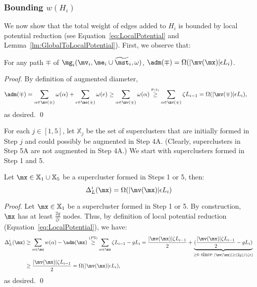 \subsubsection{Bounding $w(H_i)$}\label{subsec:HiWeightOracle}


We now show that the total weight of edges added to $H_i$ is bounded by local potential reduction (see Equation~\eqref{eq:LocalPotential} and Lemma~\ref{lm:GlobalToLocalPotential}).  First, we observe that:

\begin{claim}\label{clm:ADM-vs-Size}
	For any path $\mp$ of $\mg_i(\mv_i,\me_i\cup \widetilde{\mst}_i,\omega)$, $\adm(\mp) = \Omega(|\mv(\mx)| \epsilon L_i)$.
\end{claim}
\begin{proof}
	By definition of augmented diameter,
	\begin{equation*}
	\begin{split}
	\adm(\mp) &= \sum_{\alpha \in \mv(\mp)}\omega(\alpha) + \sum_{e\in \me(\mp)}\omega(e)  \geq \sum_{\alpha \in \mv(\mp)}\omega(\alpha) \stackrel{\mbox{\tiny{P(5)}}}{\geq}  \sum_{\alpha \in \mv(\mp)}\zeta L_{i-1}= \Omega(|\mv(\mp)| \epsilon L_i),
	\end{split}
	\end{equation*}
as desired.
\qed
\end{proof}
For each $j \in [1,5]$, let $\mathbb{X}_j$ be the set of superclusters that are initially formed in Step $j$ and could possibly be augmented in Step 4A. (Clearly, superclusters in Step 5A are not augmented in Step 4A.) We start with superclusters formed in Step 1 and 5.

\begin{lemma}\label{lm:Step15WeightOracle}
	Let $\mx \in \mathbb{X}_1 \cup \mathbb{X}_5$ be a supercluster formed in  Steps 1 or 5, then:
	\begin{equation*}
	\Delta^i_{L}(\mx) = \Omega(|\mv(\mx)|\epsilon L_i)  
	\end{equation*}
\end{lemma}
\begin{proof} Let $\mx \in \mathbb{X}_1$ be a supercluster formed in Step 1 or 5.	By construction, $\mx$ has at least $\frac{2g}{\zeta \epsilon}$ nodes. Thus,  by definition of local potential reduction (Equation~\eqref{eq:LocalPotential}), we have:
	\begin{equation}
	\begin{split}
	\Delta^i_L(\mx) &\geq \sum_{\alpha \in \mx}w(\alpha)  - \adm(\mx) \stackrel{(P5)}{\geq} \sum_{\alpha \in \mx}\zeta L_{i-1} - gL_i  = \frac{|\mv(\mx)| \zeta L_{i-1}}{2} + \underbrace{(\frac{|\mv(\mx)| \zeta L_{i-1}}{2} - gL_i)}_{\geq 0 \mbox{ since }|\mv(\mx)|\geq (2g)/(\zeta \epsilon)}\\
	&\geq  \frac{|\mv(\mx)| \zeta L_{i-1}}{2}  = \Omega(|\mv(\mx)|\epsilon L_{i}),
	\end{split}
	\end{equation}
	as desired. \qed 
\end{proof}



